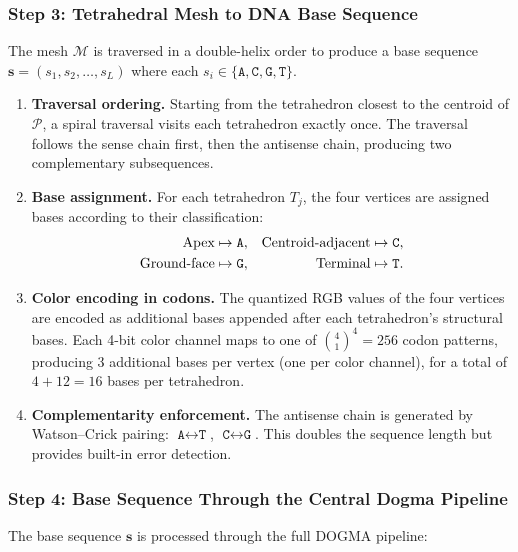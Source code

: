 \subsubsection{Step 3: Tetrahedral Mesh to DNA Base Sequence}

The mesh $\mathcal{M}$ is traversed in a double-helix order to produce a base sequence $\mathbf{s} = (s_1, s_2, \ldots, s_L)$ where each $s_i \in \{\texttt{A}, \texttt{C}, \texttt{G}, \texttt{T}\}$.

\begin{enumerate}[leftmargin=1.8em]
  \item \textbf{Traversal ordering.} Starting from the tetrahedron closest to the centroid of $\mathcal{P}$, a spiral traversal visits each tetrahedron exactly once. The traversal follows the sense chain first, then the antisense chain, producing two complementary subsequences.
  \item \textbf{Base assignment.} For each tetrahedron $T_j$, the four vertices are assigned bases according to their classification:
  \begin{align}
    \text{Apex} &\mapsto \texttt{A}, &
    \text{Centroid-adjacent} &\mapsto \texttt{C}, \notag \\
    \text{Ground-face} &\mapsto \texttt{G}, &
    \text{Terminal} &\mapsto \texttt{T}. \notag
  \end{align}
  \item \textbf{Color encoding in codons.} The quantized RGB values of the four vertices are encoded as additional bases appended after each tetrahedron's structural bases. Each 4-bit color channel maps to one of $\binom{4}{1}^4 = 256$ codon patterns, producing 3 additional bases per vertex (one per color channel), for a total of $4 + 12 = 16$ bases per tetrahedron.
  \item \textbf{Complementarity enforcement.} The antisense chain is generated by Watson--Crick pairing: $\texttt{A} \leftrightarrow \texttt{T}$, $\texttt{C} \leftrightarrow \texttt{G}$. This doubles the sequence length but provides built-in error detection.
\end{enumerate}

\subsubsection{Step 4: Base Sequence Through the Central Dogma Pipeline}

The base sequence $\mathbf{s}$ is processed through the full DOGMA pipeline:


